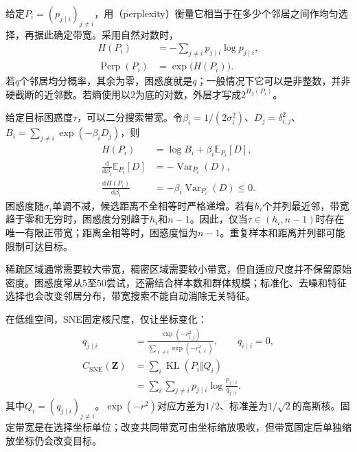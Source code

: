 给定$P_i=(p_{j\mid i})_{j\ne i}$，用（perplexity）衡量它相当于在多少个邻居之间作均匀选择，再据此确定带宽。采用自然对数时，
\begin{equation}
  \label{eq:dim-sne-perplexity}
  \begin{aligned}
    H(P_i)&=-\sum_{j\ne i}p_{j\mid i}\log p_{j\mid i},\\
    \operatorname{Perp}(P_i)&=\exp\!\bigl(H(P_i)\bigr).
  \end{aligned}
\end{equation}
若$q$个邻居均分概率，其余为零，困惑度就是$q$；一般情况下它可以是非整数，并非硬截断的近邻数。若熵使用以$2$为底的对数，外层才写成$2^{H_2(P_i)}$。

给定目标困惑度$\tau$，可以二分搜索带宽。令$\beta_i=1/(2\sigma_i^2)$、$D_j=\delta_{i,j}^2$、$B_i=\sum_{j\ne i}\exp(-\beta_iD_j)$，则
\begin{equation}
  \label{eq:dim-sne-entropy-monotonicity}
  \begin{aligned}
    H(P_i)&=\log B_i+\beta_i\mathbb{E}_{P_i}[D],\\
    \frac{\mathrm{d}}{\mathrm{d}\beta_i}\mathbb{E}_{P_i}[D]
      &=-\operatorname{Var}_{P_i}(D),\\
    \frac{\mathrm{d}H(P_i)}{\mathrm{d}\beta_i}
      &=-\beta_i\operatorname{Var}_{P_i}(D)\leq 0.
  \end{aligned}
\end{equation}
困惑度随$\sigma_i$单调不减，候选距离不全相等时严格递增。若有$h_i$个并列最近邻，带宽趋于零和无穷时，困惑度分别趋于$h_i$和$n-1$。因此，仅当$\tau\in(h_i,n-1)$时存在唯一有限正带宽；距离全相等时，困惑度恒为$n-1$。重复样本和距离并列都可能限制可达目标。

稀疏区域通常需要较大带宽，稠密区域需要较小带宽，但自适应尺度并不保留原始密度。困惑度常从$5$至$50$尝试，还需结合样本数和群体规模；标准化、去噪和特征选择也会改变邻居分布，带宽搜索不能自动消除无关特征。

在低维空间，SNE固定核尺度，仅让坐标变化：
\begin{equation}
  \label{eq:dim-sne-low-loss}
  \begin{aligned}
    q_{j\mid i}
      &=\frac{\exp(-r_{i,j}^2)}
      {\sum_{\ell\ne i}\exp(-r_{i,\ell}^2)},\qquad q_{i\mid i}=0,\\
    C_{\mathrm{SNE}}(\bm{Z})
      &=\sum_i\operatorname{KL}(P_i\Vert Q_i)\\
      &=\sum_i\sum_{j\ne i}p_{j\mid i}
        \log\frac{p_{j\mid i}}{q_{j\mid i}}.
  \end{aligned}
\end{equation}
其中$Q_i=(q_{j\mid i})_{j\ne i}$。$\exp(-r^2)$对应方差为$1/2$、标准差为$1/\sqrt{2}$的高斯核。固定带宽是在选择坐标单位；改变共同带宽可由坐标缩放吸收，但带宽固定后单独缩放坐标仍会改变目标。

